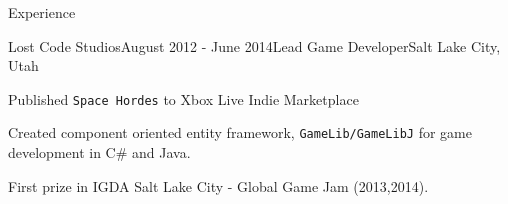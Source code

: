 \documentclass{resume} %
\begin{document}
\begin{rSection}{Experience}
\begin{rSubsection}{Lost Code Studios}{August 2012 - June 2014}{Lead Game Developer}{Salt Lake City, Utah}
\item Published \texttt{Space Hordes} to Xbox Live Indie Marketplace
\item Created component oriented entity framework, \texttt{GameLib/GameLibJ} for game development in C\# and Java.
\item First prize in IGDA Salt Lake City - Global Game Jam (2013,2014).
\end{rSubsection}




\end{rSection}

\clearpage
\end{document}
